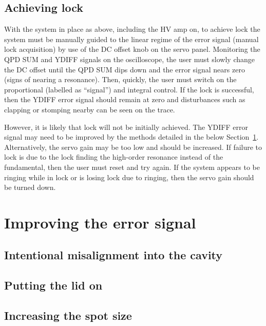 \documentclass[aps,pra,superscriptaddress,reprint,nofootinbib]{revtex4-1}
\begin{document}
\subsection{Achieving lock}

With the system in place as above, including the HV amp on, to achieve lock the system must be manually guided to the linear regime of the error signal (manual lock acquisition) by use of the DC offset knob on the servo panel. Monitoring the QPD SUM and YDIFF signals on the oscilloscope, the user must slowly change the DC offset until the QPD SUM dips down and the error signal nears zero (signs of nearing a resonance). Then, quickly, the user must switch on the proportional (labelled as “signal”) and integral control. If the lock is successful, then the YDIFF error signal should remain at zero and disturbances such as clapping or stomping nearby can be seen on the trace.


However, it is likely that lock will not be initially achieved. The YDIFF error signal may need to be improved by the methods detailed in the below Section~\ref{sec:error_signal}. Alternatively, the servo gain may be too low and should be increased. If failure to lock is due to the lock finding the high-order resonance instead of the fundamental, then the user must reset and try again. If the system appears to be ringing while in lock or is losing lock due to ringing, then the servo gain should be turned down.


\section{Improving the error signal}
\label{sec:error_signal}

\subsection{Intentional misalignment into the cavity}



\subsection{Putting the lid on}


\subsection{Increasing the spot size}
\end{document}
